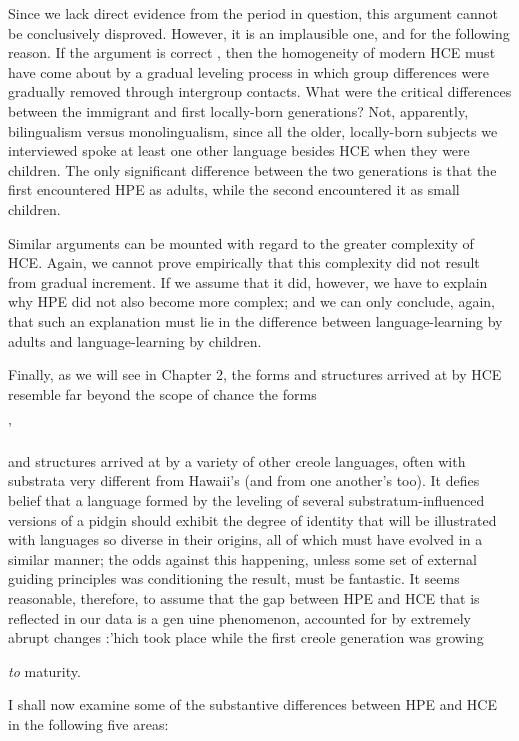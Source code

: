 Since we lack direct evidence from the period in question, this argument cannot be conclusively disproved. However, it is an im\-plausible one, and for the following reason. If the argument is correct , then the homogeneity of modern HCE must have come about by a gradual leveling process in which group differences were gradually removed through intergroup contacts. What were the critical differ\-ences between the immigrant and first locally-born generations? Not, apparently, bilingualism versus monolingualism, since all the older, locally-born subjects we interviewed spoke at least one other language besides HCE when they were children. The only significant difference between the two generations is that the first encountered HPE as adults, while the second encountered it as small children.

Similar arguments can be mounted with regard to the greater complexity of HCE. Again, we cannot prove empirically that this complexity did not result from gradual increment. If we assume that it did, however, we have to explain why HPE did not also become more complex; and we can only conclude, again, that such an explanation must lie in the difference between language-learning by adults and language-learning by children.

Finally, as we will see in Chapter 2, the forms and structures arrived at by HCE resemble far beyond the scope of chance the forms

'


and structures arrived at by a variety of other creole languages, often with substrata very different from Hawaii's (and from one another's too). It defies belief that a language formed by the leveling of several substratum-influenced versions of a pidgin should exhibit the degree of identity that will be illustrated with languages so diverse in their origins, all of which must have evolved in a similar manner; the odds against this happening, unless some set of external guiding principles was condi\-tioning the result, must be fantastic. It seems reasonable, therefore, to assume that the gap between HPE and HCE that is reflected in our data is a gen uine phenomenon, accounted for by extremely abrupt changes :'hich took place while the first creole generation was growing

\textit{to} maturity.

I shall now examine some of the substantive differences between HPE and HCE in the following five areas:


